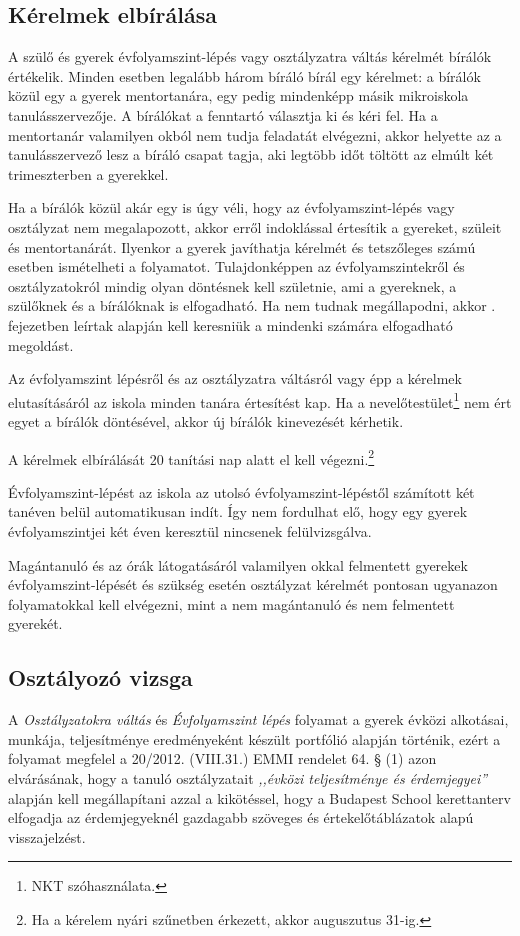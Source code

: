 
\subsection{Kérelmek elbírálása}

A szülő és gyerek évfolyamszint-lépés vagy osztályzatra váltás kérelmét bírálók
értékelik. Minden esetben legalább három bíráló bírál egy kérelmet: a
bírálók közül egy a gyerek mentortanára, egy pedig mindenképp másik mikroiskola
tanulásszervezője. A bírálókat a fenntartó választja ki és kéri fel. Ha a
mentortanár valamilyen okból nem tudja feladatát elvégezni, akkor helyette az a
tanulásszervező lesz a bíráló csapat tagja, aki legtöbb időt töltött az elmúlt
két trimeszterben a gyerekkel.

Ha a bírálók közül akár egy is úgy véli, hogy az évfolyamszint-lépés vagy
osztályzat nem megalapozott, akkor
erről indoklással értesítik a gyereket, szüleit és mentortanárát. Ilyenkor a
gyerek javíthatja kérelmét és tetszőleges számú esetben ismételheti a
folyamatot. Tulajdonképpen az évfolyamszintekről és osztályzatokról mindig
olyan döntésnek kell születnie, ami a gyereknek, a szülőknek és a bírálóknak is
elfogadható. Ha nem tudnak megállapodni, akkor
. fejezetben leírtak alapján kell keresniük a
mindenki számára elfogadható megoldást.

Az évfolyamszint lépésről és az osztályzatra váltásról vagy épp a kérelmek
elutasításáról az iskola minden tanára értesítést kap. Ha a
nevelőtestület\footnote{NKT szóhasználata.}
nem ért egyet a bírálók döntésével, akkor új bírálók kinevezését kérhetik.

A kérelmek elbírálását 20 tanítási nap alatt el kell végezni.\footnote{Ha a
    kérelem nyári szűnetben érkezett, akkor auguszutus 31-ig.}

Évfolyamszint-lépést az iskola az utolsó évfolyamszint-lépéstől számított két
tanéven belül automatikusan indít. Így nem fordulhat elő, hogy egy gyerek
évfolyamszintjei két éven keresztül nincsenek felülvizsgálva.

Magántanuló és az órák látogatásáról valamilyen okkal felmentett gyerekek
évfolyamszint-lépését és szükség esetén osztályzat kérelmét pontosan ugyanazon
folyamatokkal kell elvégezni, mint a nem magántanuló és nem felmentett
gyerekét.

\subsection{Osztályozó vizsga}
A \emph{Osztályzatokra váltás} és \emph{Évfolyamszint lépés} folyamat a gyerek
évközi alkotásai, munkája, teljesítménye
eredményeként
készült portfólió alapján történik, ezért a folyamat megfelel a 20/2012.
(VIII.31.) EMMI rendelet 64. § (1) azon elvárásának, hogy a tanuló
osztályzatait
\emph{,,évközi teljesítménye és érdemjegyei''} alapján kell megállapítani azzal
a kikötéssel, hogy a Budapest School kerettanterv elfogadja az érdemjegyeknél
gazdagabb
szöveges és értekelőtáblázatok alapú visszajelzést.

